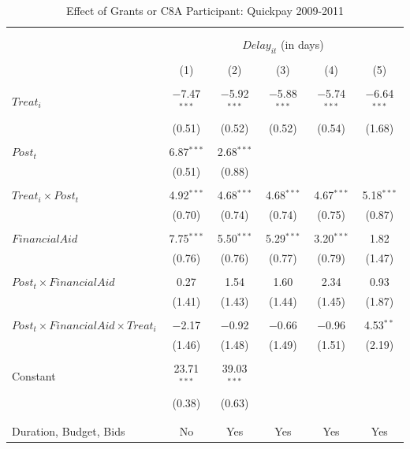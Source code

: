 \documentclass[
]{article}
\begin{document}
\begin{table}[H] \centering 
  \caption{Effect of Grants or C8A Participant: Quickpay 2009-2011} 
  \label{} 
\small 
\begin{tabular}{@{\extracolsep{-2pt}}lccccc} 
\\[-1.8ex]\hline 
\hline \\[-1.8ex] 
\\[-1.8ex] & \multicolumn{5}{c}{$Delay_{it}$ (in days)} \\ 
\\[-1.8ex] & (1) & (2) & (3) & (4) & (5)\\ 
\hline \\[-1.8ex] 
 $Treat_i$ & $-$7.47$^{***}$ & $-$5.92$^{***}$ & $-$5.88$^{***}$ & $-$5.74$^{***}$ & $-$6.64$^{***}$ \\ 
  & (0.51) & (0.52) & (0.52) & (0.54) & (1.68) \\ 
  & & & & & \\ 
 $Post_t$ & 6.87$^{***}$ & 2.68$^{***}$ &  &  &  \\ 
  & (0.51) & (0.88) &  &  &  \\ 
  & & & & & \\ 
 $Treat_i \times Post_t$ & 4.92$^{***}$ & 4.68$^{***}$ & 4.68$^{***}$ & 4.67$^{***}$ & 5.18$^{***}$ \\ 
  & (0.70) & (0.74) & (0.74) & (0.75) & (0.87) \\ 
  & & & & & \\ 
 $FinancialAid$ & 7.75$^{***}$ & 5.50$^{***}$ & 5.29$^{***}$ & 3.20$^{***}$ & 1.82 \\ 
  & (0.76) & (0.76) & (0.77) & (0.79) & (1.47) \\ 
  & & & & & \\ 
 $Post_t \times FinancialAid$ & 0.27 & 1.54 & 1.60 & 2.34 & 0.93 \\ 
  & (1.41) & (1.43) & (1.44) & (1.45) & (1.87) \\ 
  & & & & & \\ 
 $Post_t \times FinancialAid \times Treat_i$ & $-$2.17 & $-$0.92 & $-$0.66 & $-$0.96 & 4.53$^{**}$ \\ 
  & (1.46) & (1.48) & (1.49) & (1.51) & (2.19) \\ 
  & & & & & \\ 
 Constant & 23.71$^{***}$ & 39.03$^{***}$ &  &  &  \\ 
  & (0.38) & (0.63) &  &  &  \\ 
  & & & & & \\ 
\hline \\[-1.8ex] 
Duration, Budget, Bids & No & Yes & Yes & Yes & Yes \\ 

\end{tabular}
\end{table}
\end{document}
